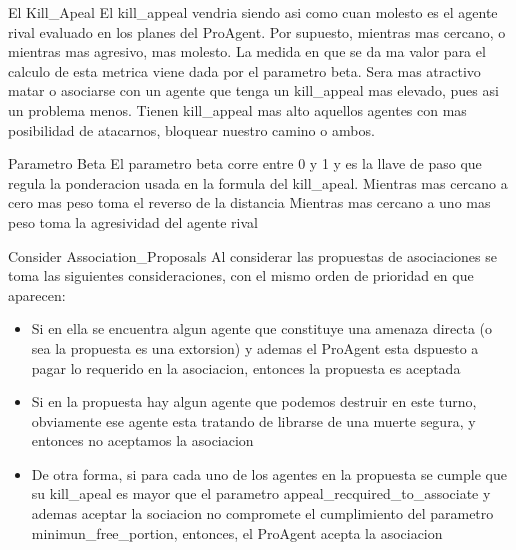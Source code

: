 \documentclass{beamer}
\begin{document}
\begin{frame}{El Kill_Apeal}
    El kill_appeal vendria siendo asi como cuan molesto es el agente rival evaluado en los planes del ProAgent. Por supuesto, mientras mas cercano, o mientras mas agresivo, mas molesto. La medida en que se da ma valor para el calculo de esta metrica viene dada por el parametro beta.
    Sera mas atractivo matar o asociarse con un agente que tenga un kill_appeal mas elevado, pues asi un problema menos. Tienen kill_appeal mas alto aquellos agentes con mas posibilidad de atacarnos, bloquear nuestro camino o ambos.
\end{frame}

\begin{frame}{Parametro Beta}
    El parametro beta corre entre 0 y 1 y es la llave de paso que regula la ponderacion usada en la formula del kill_apeal.
    Mientras mas cercano a cero mas peso toma el reverso de la distancia
    Mientras mas cercano a uno mas peso toma la agresividad del agente rival
\end{frame}

\begin{frame}{Consider Association_Proposals}
    Al considerar las propuestas de asociaciones se toma las siguientes consideraciones, con el mismo orden de prioridad en que aparecen:
    \begin{itemize}
        \item Si en ella se encuentra algun agente que constituye una amenaza directa (o sea la propuesta es una extorsion) y ademas el ProAgent esta dspuesto a pagar lo requerido en la asociacion, entonces la propuesta es aceptada
        \item Si en la propuesta hay algun agente que podemos destruir en este turno, obviamente ese agente esta tratando de librarse de una muerte segura, y entonces no aceptamos la asociacion
        \item De otra forma, si para cada uno de los agentes en la propuesta se cumple que su kill_apeal es mayor que el parametro appeal_recquired_to_associate y ademas aceptar la sociacion no compromete el cumplimiento del parametro minimun_free_portion, entonces, el ProAgent acepta la asociacion
    \end{itemize}
\end{frame}
\end{document}
